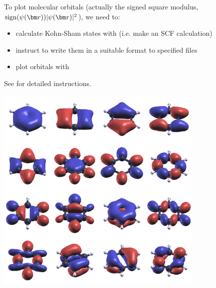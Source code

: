 \documentclass[landscape]{foils}
\DeclareMathOperator{\sign}{sign}
\begin{document}
To plot molecular orbitals (actually the signed square modulus,
$\sign(\psi(\vr))|\psi(\vr)|^2$), we need to:
\begin{itemize}
\item calculate Kohn-Sham states with  (i.e. make an
  SCF calculation)
\item instruct  to write them in a suitable format to
  specified files
\item plot orbitals with 
\end{itemize}
See  for detailed instructions.
\vspace{-4cm}
\begin{flushright}
  \includegraphics[width=10cm]{figs/psi2-benzene.png}  
\end{flushright}

\end{document}

